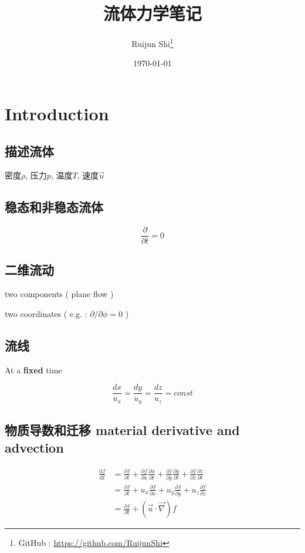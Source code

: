 \documentclass[fontset=windows]{report}
\title{\heiti\zihao{1} 流体力学笔记}
\author{\songti\zihao{3} Ruijun Shi\thanks{GitHub : \href{https://github.com/RuijunShi}{https://github.com/RuijunShi}}}
\date{\songti\zihao{3} \today}
\begin{document}
  \maketitle
  \thispagestyle{empty}
  \tableofcontents


\chapter{Introduction}

\section{描述流体}

密度\(\rho\), 压力\(p\), 温度\(T\), 速度\(\vec{u}\)

\section{稳态和非稳态流体}

\[\frac{\partial}{\partial t}=0\]

\section{二维流动}

two components ( plane flow )

two coordinates ( e.g. : \(\partial / \partial \phi = 0\) )

\section{流线}

At a \textbf{fixed} time

\[\frac{dx}{u_x}=\frac{dy}{u_y}=\frac{dz}{u_z}=const\]


\section{物质导数和迁移 material derivative and advection}
\begin{equation}
  \begin{aligned}
    \frac{\mathrm{d}f}{\mathrm{d}t}
    &=\frac{\partial f}{\partial t}+
    \frac{\partial f}{\partial x}\frac{\partial x}{\partial t}+
    \frac{\partial f}{\partial y}\frac{\partial y}{\partial t}+
    \frac{\partial f}{\partial z}\frac{\partial z}{\partial t}\\
    &=  \frac{\partial f}{\partial t}+
    u_x \frac{\partial f}{\partial x}+
    u_y \frac{\partial f}{\partial y}+
    u_z \frac{\partial f}{\partial z}\\
    &=\frac{\partial f}{\partial t}+(\vec{u}\cdot\vec{\nabla})f
    \end{aligned}
\end{equation}
\end{document}
